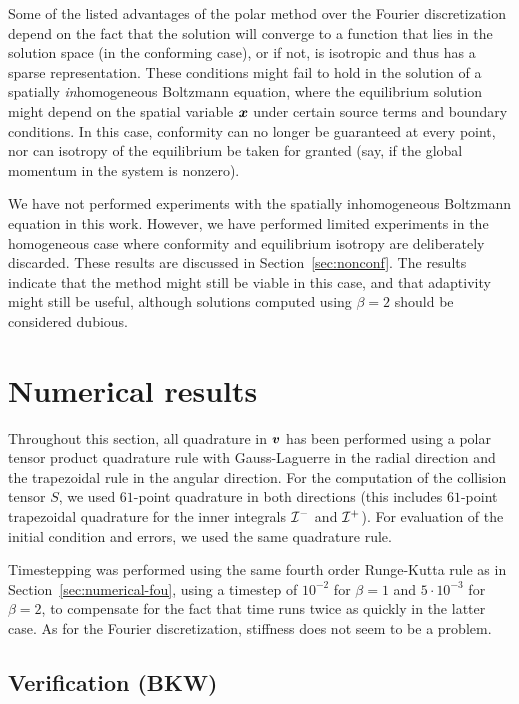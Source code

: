 Some of the listed advantages of the polar method over the Fourier discretization depend on the fact that the
solution will converge to a function that lies in the solution space (in the conforming case), or if not, is
isotropic and thus has a sparse representation. These conditions might fail to hold in the solution of a
spatially {\em in}homogeneous Boltzmann equation, where the equilibrium solution might depend on the spatial
variable ${\bm x}$ under certain source terms and boundary conditions. In this case, conformity can no longer be
guaranteed at every point, nor can isotropy of the equilibrium be taken for granted (say, if the global
momentum in the system is nonzero).

We have not performed experiments with the spatially inhomogeneous Boltzmann equation in this work. However,
we have performed limited experiments in the homogeneous case where conformity and equilibrium isotropy are
deliberately discarded. These results are discussed in Section~\ref{sec:nonconf}. The results indicate that
the method might still be viable in this case, and that adaptivity might still be useful, although solutions
computed using $\beta=2$ should be considered dubious.

\section{Numerical results} \label{sec:numerical-pol}

Throughout this section, all quadrature in ${\bm v}$ has been performed using a polar tensor product quadrature
rule with Gauss-Laguerre in the radial direction and the trapezoidal rule in the angular direction. For the
computation of the collision tensor $S$, we used $61$-point quadrature in both directions (this includes
$61$-point trapezoidal quadrature for the inner integrals $\mathcal{I}^-$ and $\mathcal{I}^+$). For evaluation of the initial
condition and errors, we used the same quadrature rule.

Timestepping was performed using the same fourth order Runge-Kutta rule as in Section~\ref{sec:numerical-fou},
using a timestep of $10^{-2}$ for $\beta=1$ and $5\cdot10^{-3}$ for $\beta=2$, to compensate for the fact that
time runs twice as quickly in the latter case. As for the Fourier discretization, stiffness does not
seem to be a problem.

\subsection{Verification (BKW)} \label{sec:numpol-verify}

